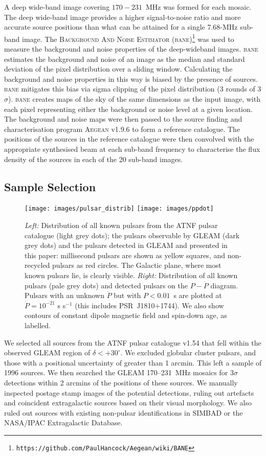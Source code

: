 \documentclass{pasa}%
\newcommand{\changed}[1]{{#1}}
\begin{document}
A deep wide-band image covering $170-231$~MHz was formed for each mosaic. The deep wide-band image provides a higher signal-to-noise ratio and more accurate source positions than what can be attained for a single 7.68-MHz sub-band image. The \textsc{Background And Noise Estimator (bane)}\footnote{\texttt{https://github.com/PaulHancock/Aegean/wiki/BANE}} was used to measure the background and noise properties of the deep-wideband images. \textsc{bane} estimates the background and noise of an image as the median and standard deviation of the pixel distribution over a sliding window. 
\changed{Calculating the background and noise properties in this way is biased by the presence of sources. \textsc{bane} mitigates this bias via sigma clipping of the pixel distribution (3 rounds of 3$\sigma$).}
\textsc{bane} creates maps of the sky of the same dimensions as the input image, with each pixel representing either the background or noise level at a given location. The background and noise maps were then passed to the source finding and characterisation program \textsc{Aegean} v1.9.6 \citep{hancock12} to form a reference catalogue. The positions of the sources in the reference catalogue were then convolved with the appropriate synthesised beam at each sub-band frequency to characterise the flux density of the sources in each of the 20 sub-band images.

\subsection{Sample Selection}
\begin{figure*}
\texttt{[image: images/pulsar\_distrib]}
\texttt{[image: images/ppdot]}
\caption{{\it Left:} Distribution of all known pulsars from the ATNF pulsar catalogue (light grey dots); the pulsars observable by GLEAM (dark grey dots) and the pulsars detected in GLEAM and presented in this paper: millisecond pulsars are shown as yellow squares, and non-recycled pulsars as red circles. The Galactic plane, where most known pulsars lie, is clearly visible.
{\it Right:} Distribution of all known pulsars (pale grey dots) and detected pulsars on the $P-\dot{P}$ diagram. Pulsars with an unknown $\dot P$ but with $P<0.01$~s are plotted at $\dot P = 10^{-21}$ s s$^{-1}$ (this includes PSR~J1810$+$1744).  We also show contours of constant dipole magnetic field and spin-down age, as labelled.}
\label{distrib}
\end{figure*}

We selected all sources from the ATNF pulsar catalogue v1.54 \citep{manchester05} that fell within the observed GLEAM region of $\delta < +30^\circ$. We excluded globular cluster pulsars, and those with a positional uncertainty of greater than 1 arcmin. This left a sample of 1996 sources. We then searched the GLEAM 170--231~MHz mosaics for $3\sigma$ detections within 2 arcmins of the positions of these sources. We manually inspected postage stamp images of the potential detections, ruling out artefacts and coincident
extragalactic sources based on their visual morphology. We also ruled out sources with existing non-pulsar identifications in SIMBAD or the NASA/IPAC Extragalactic Database.
\end{document}

